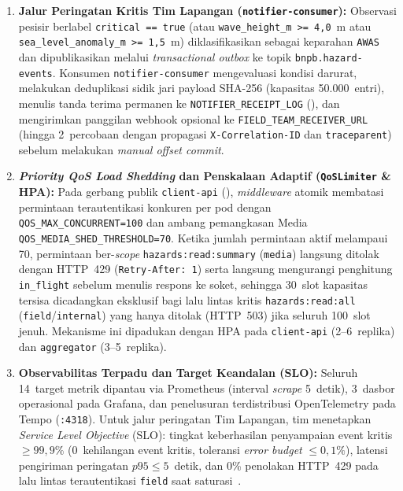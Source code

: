 \begin{enumerate}
    \item \textbf{Jalur Peringatan Kritis Tim Lapangan (\texttt{notifier-consumer}):} Observasi pesisir berlabel \texttt{critical == true} (atau \texttt{wave\_height\_m >= 4,0}~m atau \texttt{sea\_level\_anomaly\_m >= 1,5}~m) diklasifikasikan sebagai keparahan \texttt{AWAS} dan dipublikasikan melalui \textit{transactional outbox} ke topik \texttt{bnpb.hazard-events}. Konsumen \texttt{notifier-consumer} mengevaluasi kondisi darurat, melakukan deduplikasi sidik jari payload SHA-256 (kapasitas 50.000~entri), menulis tanda terima permanen ke \texttt{NOTIFIER\_RECEIPT\_LOG} (), dan mengirimkan panggilan webhook opsional ke \texttt{FIELD\_TEAM\_RECEIVER\_URL} (hingga 2~percobaan dengan propagasi \texttt{X-Correlation-ID} dan \texttt{traceparent}) sebelum melakukan \textit{manual offset commit}.
    \item \textbf{\textit{Priority QoS Load Shedding} dan Penskalaan Adaptif (\texttt{QoSLimiter} \& HPA):} Pada gerbang publik \texttt{client-api} (), \textit{middleware} atomik membatasi permintaan terautentikasi konkuren per pod dengan \texttt{QOS\_MAX\_CONCURRENT=100} dan ambang pemangkasan Media \texttt{QOS\_MEDIA\_SHED\_THRESHOLD=70}. Ketika jumlah permintaan aktif melampaui 70, permintaan ber-\textit{scope} \texttt{hazards:read:summary} (\texttt{media}) langsung ditolak dengan HTTP~429 (\texttt{Retry-After: 1}) serta langsung mengurangi penghitung \texttt{in\_flight} sebelum menulis respons ke soket, sehingga 30~slot kapasitas tersisa dicadangkan eksklusif bagi lalu lintas kritis \texttt{hazards:read:all} (\texttt{field}/\texttt{internal}) yang hanya ditolak (HTTP~503) jika seluruh 100~slot jenuh. Mekanisme ini dipadukan dengan HPA pada \texttt{client-api} (2--6~replika) dan \texttt{aggregator} (3--5~replika).
    \item \textbf{Observabilitas Terpadu dan Target Keandalan (SLO):} Seluruh 14~target metrik dipantau via Prometheus (interval \textit{scrape} 5~detik), 3~dasbor operasional pada Grafana, dan penelusuran terdistribusi OpenTelemetry pada Tempo (\texttt{:4318}). Untuk jalur peringatan Tim Lapangan, tim menetapkan \textit{Service Level Objective} (SLO): tingkat keberhasilan penyampaian event kritis $\ge 99{,}9\%$ (0~kehilangan event kritis, toleransi \textit{error budget} $\le 0{,}1\%$), latensi pengiriman peringatan $p95 \le 5$~detik, dan 0\% penolakan HTTP~429 pada lalu lintas terautentikasi \texttt{field} saat saturasi~\cite{beyer2016sre}.
\end{enumerate}

